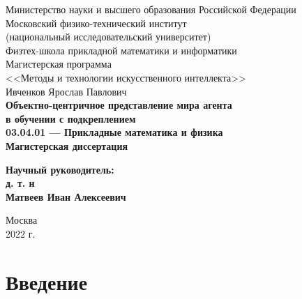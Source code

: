 \documentclass[12pt]{article} %
\begin{document}
{
\renewcommand{\baselinestretch}{1}
\thispagestyle{empty}
\begin{center}
    \sc
        Министерство науки и высшего образования Российской Федерации\\
        Московский физико-технический институт\\
        {\rm(национальный исследовательский университет)}\\
        Физтех-школа прикладной математики и информатики\\
        Магистерская программа\\
        <<Методы и технологии искусственного интеллекта>>\\[35mm]
    \rm\large
        Ивченков Ярослав Павлович\\[10mm]
    \bf\Large
        Объектно-центричное представление мира агента \\
        в обучении с подкреплением\\[10mm]
    \rm\normalsize
        03.04.01 --- Прикладные математика и физика\\[10mm]
    \sc
        Магистерская диссертация\\[30mm]
\end{center}
\hfill\parbox{80mm}{
    \begin{flushleft}
    \bf
        Научный руководитель:\\
    \rm
        д. т. н\\
        Матвеев Иван Алексеевич\\[5cm]
    \end{flushleft}
}
\begin{center}
    Москва\\
    2022 г.
\end{center}
}

\clearpage
\tableofcontents

\newpage
\begin{abstract}
    
\end{abstract}

\clearpage
\section{Введение}



\clearpage
\end{document}
